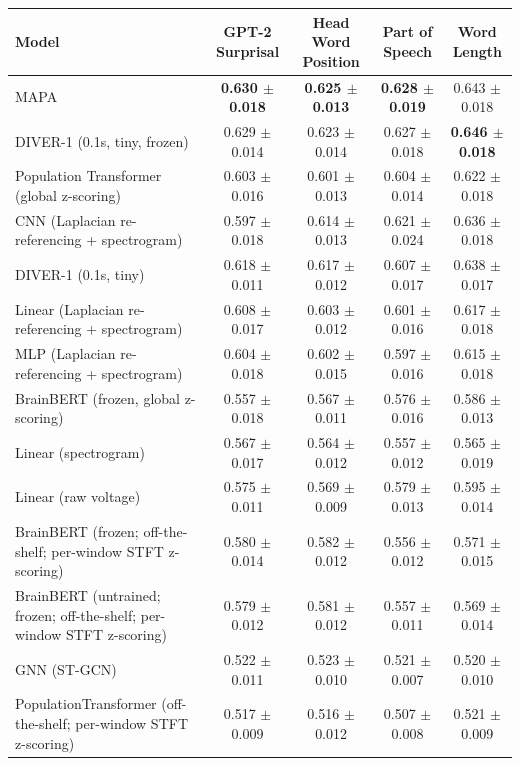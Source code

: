 \begin{table}[!htbp]
\begin{tabular}{>{\raggedright\arraybackslash}p{8cm}cccc}
\hline
\end{tabular}
\hspace{1em}
\hspace*{-2.5cm}\begin{tabular}{>{\raggedright\arraybackslash}p{8cm}cccc}
\hline
Model & GPT-2 Surprisal & Head Word Position & Part of Speech & Word Length \\
\hline
MAPA & \textbf{0.630 $\pm$ 0.018} & \textbf{0.625 $\pm$ 0.013} & \textbf{0.628 $\pm$ 0.019} & 0.643 $\pm$ 0.018 \\
DIVER-1 (0.1s, tiny, frozen) & 0.629 $\pm$ 0.014 & 0.623 $\pm$ 0.014 & 0.627 $\pm$ 0.018 & \textbf{0.646 $\pm$ 0.018} \\
Population Transformer (global z-scoring) & 0.603 $\pm$ 0.016 & 0.601 $\pm$ 0.013 & 0.604 $\pm$ 0.014 & 0.622 $\pm$ 0.018 \\
CNN (Laplacian re-referencing + spectrogram) & 0.597 $\pm$ 0.018 & 0.614 $\pm$ 0.013 & 0.621 $\pm$ 0.024 & 0.636 $\pm$ 0.018 \\
DIVER-1 (0.1s, tiny) & 0.618 $\pm$ 0.011 & 0.617 $\pm$ 0.012 & 0.607 $\pm$ 0.017 & 0.638 $\pm$ 0.017 \\
Linear (Laplacian re-referencing + spectrogram) & 0.608 $\pm$ 0.017 & 0.603 $\pm$ 0.012 & 0.601 $\pm$ 0.016 & 0.617 $\pm$ 0.018 \\
MLP (Laplacian re-referencing + spectrogram) & 0.604 $\pm$ 0.018 & 0.602 $\pm$ 0.015 & 0.597 $\pm$ 0.016 & 0.615 $\pm$ 0.018 \\
BrainBERT (frozen, global z-scoring) & 0.557 $\pm$ 0.018 & 0.567 $\pm$ 0.011 & 0.576 $\pm$ 0.016 & 0.586 $\pm$ 0.013 \\
Linear (spectrogram) & 0.567 $\pm$ 0.017 & 0.564 $\pm$ 0.012 & 0.557 $\pm$ 0.012 & 0.565 $\pm$ 0.019 \\
Linear (raw voltage) & 0.575 $\pm$ 0.011 & 0.569 $\pm$ 0.009 & 0.579 $\pm$ 0.013 & 0.595 $\pm$ 0.014 \\
BrainBERT (frozen; off-the-shelf; per-window STFT z-scoring) & 0.580 $\pm$ 0.014 & 0.582 $\pm$ 0.012 & 0.556 $\pm$ 0.012 & 0.571 $\pm$ 0.015 \\
BrainBERT (untrained; frozen; off-the-shelf; per-window STFT z-scoring) & 0.579 $\pm$ 0.012 & 0.581 $\pm$ 0.012 & 0.557 $\pm$ 0.011 & 0.569 $\pm$ 0.014 \\
GNN (ST-GCN) & 0.522 $\pm$ 0.011 & 0.523 $\pm$ 0.010 & 0.521 $\pm$ 0.007 & 0.520 $\pm$ 0.010 \\
PopulationTransformer (off-the-shelf; per-window STFT z-scoring) & 0.517 $\pm$ 0.009 & 0.516 $\pm$ 0.012 & 0.507 $\pm$ 0.008 & 0.521 $\pm$ 0.009 \\

\end{tabular}
\end{table}

